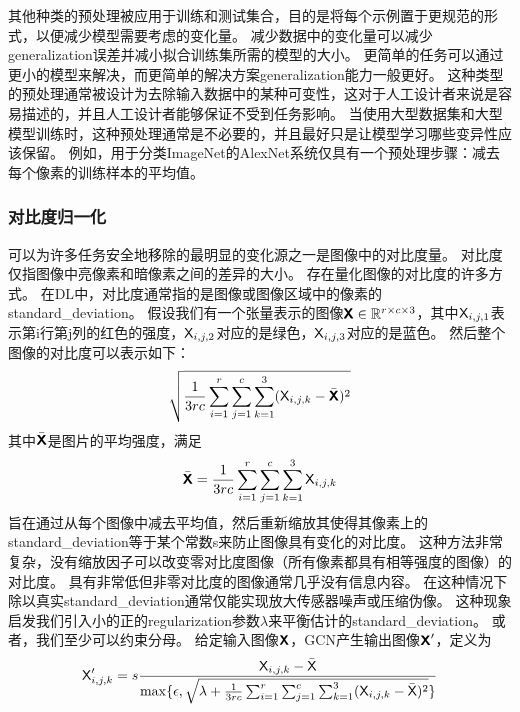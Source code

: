 其他种类的预处理被应用于训练和测试集合，目的是将每个示例置于更规范的形式，以便减少模型需要考虑的变化量。
减少数据中的变化量可以减少\gls{generalization}误差并减小拟合训练集所需的模型的大小。
更简单的任务可以通过更小的模型来解决，而更简单的解决方案\gls{generalization}能力一般更好。
这种类型的预处理通常被设计为去除输入数据中的某种可变性，这对于人工设计者来说是容易描述的，并且人工设计者能够保证不受到任务影响。
当使用大型数据集和大型模型训练时，这种预处理通常是不必要的，并且最好只是让模型学习哪些变异性应该保留。%
例如，用于分类ImageNet的AlexNet系统仅具有一个预处理步骤：减去每个像素的训练样本的平均值\citep{Krizhevsky-2012}。

\subsubsection{对比度归一化}
\label{sec:contrast_normalization}

可以为许多任务安全地移除的最明显的变化源之一是图像中的对比度量。
对比度仅指图像中亮像素和暗像素之间的差异的大小。
存在量化图像的对比度的许多方式。
在\gls{DL}中，对比度通常指的是图像或图像区域中的像素的\gls{standard_deviation}。
假设我们有一个张量表示的图像$\textsf{\textbf{X}} \in\mathbb{R}^{r\times c\times 3}$，其中$\textsf{X}_{i,j,1}$表示第i行第j列的红色的强度，$\textsf{X}_{i,j,2}$对应的是绿色，$\textsf{X}_{i,j,3}$对应的是蓝色。
然后整个图像的对比度可以表示如下：
\begin{align}
\label{eqn:121}
\sqrt{\frac{1}{3rc}\sum_{i=1}^{r} \sum_{j=1}^{c}\sum_{k=1}^{3} (\textsf{X}_{i,j,k} - \bar{\textsf{\textbf{X}}} )^2}
\end{align}
其中$\bar{\textsf{\textbf{X}}}$是图片的平均强度，满足
\begin{align}
\label{eqn:122}
 \bar{\textsf{\textbf{X}}} =  \frac{1}{3rc}\sum_{i=1}^{r} \sum_{j=1}^{c}\sum_{k=1}^{3}\textsf{X}_{i,j,k}
\end{align}
旨在通过从每个图像中减去平均值，然后重新缩放其使得其像素上的\gls{standard_deviation}等于某个常数s来防止图像具有变化的对比度。
这种方法非常复杂，没有缩放因子可以改变零对比度图像（所有像素都具有相等强度的图像）的对比度。
具有非常低但非零对比度的图像通常几乎没有信息内容。
在这种情况下除以真实\gls{standard_deviation}通常仅能实现放大传感器噪声或压缩伪像。
这种现象启发我们引入小的正的\gls{regularization}参数$\lambda$来平衡估计的\gls{standard_deviation}。
或者，我们至少可以约束分母。
给定输入图像$\textsf{\textbf{X}}$，\gls{GCN}产生输出图像$\textsf{\textbf{X}}'$，定义为
\begin{align}
\label{eqn:123}
\textsf{X}'_{i,j,k} = s\frac{\textsf{X}_{i,j,k} - \bar{\textsf{X}}}{\max\{ \epsilon, \sqrt{ \lambda + 
{\frac{1}{3rc}\sum_{i=1}^{r}\sum_{j=1}^{c}\sum_{k=1}^{3}} (\textsf{X}_{i,j,k} - \bar{\textsf{X}} )^2} \}}
\end{align}


